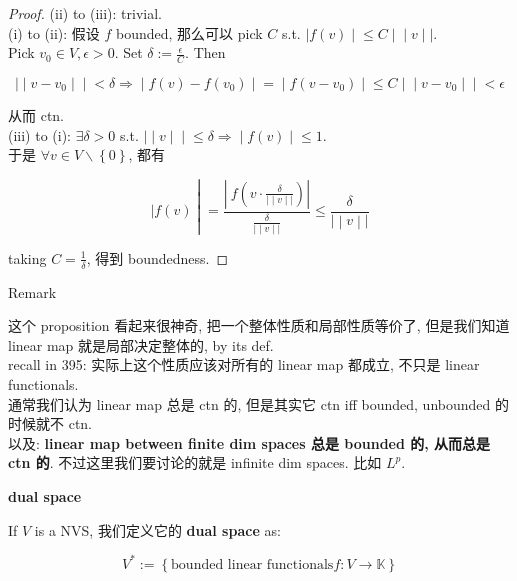 \documentclass{qlnotes-export}
\begin{document}
\begin{proof}

(ii) to (iii): trivial.\\
(i) to (ii): 假设 \(f\) bounded, 那么可以 pick \(C\) s.t. \(\left. |f(v) \middle| \leq C \middle| \middle| v \middle| | \right.\).\\
Pick \(v_{0} \in V,\epsilon > 0\). Set \(\delta := \frac{\epsilon}{C}\). Then

\[\left. | \middle| v - v_{0} \middle| \middle| < \delta\Longrightarrow \middle| f(v) - f(v_{0}) \middle| = \middle| f(v - v_{0}) \middle| \leq C \middle| \middle| v - v_{0} \middle| \middle| < \epsilon \right.\]

从而 ctn.\\
(iii) to (i): \(\exists\delta > 0\) s.t. \(\left. | \middle| v \middle| \middle| \leq \delta\Longrightarrow \middle| f(v) \middle| \leq 1 \right.\).\\
于是 \(\forall v \in V\backslash\left\{ 0 \right\}\), 都有

\[\left. |f(v) \middle| = \frac{|\ f(v \cdot \frac{\delta}{\left. | \middle| v \middle| | \right.})|}{\frac{\delta}{\left. | \middle| v \middle| | \right.}} \leq \frac{\delta}{\left. | \middle| v \middle| | \right.} \right.\]

taking \(C = \frac{1}{\delta}\), 得到 boundedness.

\end{proof}

\begin{qlremark}{Remark}

这个 proposition 看起来很神奇, 把一个整体性质和局部性质等价了, 但是我们知道 linear map 就是局部决定整体的, by its def.\\
recall in 395: 实际上这个性质应该对所有的 linear map 都成立, 不只是 linear functionals.\\
通常我们认为 linear map 总是 ctn 的, 但是其实它 ctn iff bounded, unbounded 的时候就不 ctn.\\
以及: \textbf{linear map between finite dim spaces 总是 bounded 的, 从而总是 ctn 的}. 不过这里我们要讨论的就是 infinite dim spaces. 比如 \(L^{p}\).

\end{qlremark}

\begin{definition}{\protect{}\label{kn-dual-space}{\textbf{dual space}}}

If \(V\) is a NVS, 我们定义它的 \textbf{dual space} as:

\[V^{\ast} := \left\{ {\text{bounded linear functionals} f:V\rightarrow{\mathbb{K}}} \right\}\]

\end{definition}
\end{document}
